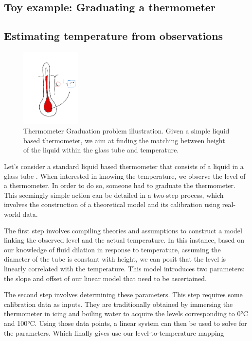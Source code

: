 \begin{bibunit}
  \section{Toy example: Graduating a thermometer}
\subsection{Estimating temperature from observations}
\begin{figure}[h]
    \centering
        \includegraphics[clip, width=3cm]{Introduction/pics/therm_pb.png}
    \caption{Thermometer Graduation problem illustration. Given a simple liquid based thermometer, we aim at finding the matching between height of the liquid within the glass tube and temperature.}
    \label{fig:therm_calib}
\end{figure}

Let's consider a standard liquid based thermometer that consists of a liquid in a glass tube .
When interested in knowing the temperature, we observe the level of a thermometer.
In order to do so, someone had to graduate the thermometer. 
This seemingly simple action can be detailed in a two-step process, which involves the construction of a theoretical model and its calibration using real-world data.

The first step involves compiling theories and assumptions to construct a model linking the observed level and the actual temperature.
In this instance, based on our knowledge of fluid dilation in response to temperature, assuming the diameter of the tube is constant with height, we can posit that the level is linearly correlated with the temperature.
This model introduces two parameters: the slope and offset of our linear model that need to be ascertained.

The second step involves determining these parameters. This step requires some calibration data as inputs. They are traditionally obtained by immersing the thermometer in icing and boiling water to acquire the levels corresponding to 0°C and 100°C.
  Using those data points, a linear system can then be used to solve for the parameters. Which finally gives use our level-to-temperature mapping



\end{bibunit}
